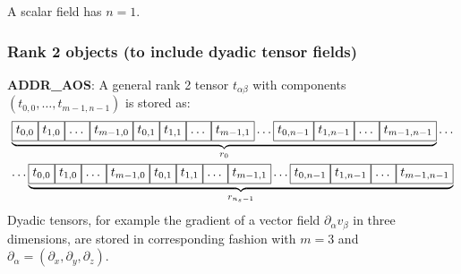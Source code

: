 A scalar field has $n=1$.


\subsubsection{Rank 2 objects (to include dyadic tensor fields)}

\textbf{ADDR\_AOS}:
A general rank 2 tensor $t_{\alpha\beta}$ with components $(t_{0,0},
\ldots, t_{m-1,n-1})$ is stored as:
\begin{gather*}
\underbrace{
\boxed{t_{0,0}\vphantom{t_{m-1,n-1}}} \boxed{t_{1,0}\vphantom{t_{m-1,n-1}}}
\boxed{\ldots\vphantom{t_{m-1,n-1}}} \boxed{t_{m-1,0}\vphantom{t_{m-1,n-1}}}
\boxed{t_{0,1}\vphantom{t_{m-1,n-1}}} \boxed{t_{1,1}\vphantom{t_{m-1,n-1}}}
\boxed{\ldots\vphantom{t_{m-1,n-1}}} \boxed{t_{m-1,1}\vphantom{t_{m-1,n-1}}}
\ldots
\boxed{t_{0,n-1}\vphantom{t_{m-1,n-1}}}\boxed{t_{1,n-1} \vphantom{t_{m-1,n-1}}}
\boxed{\ldots\vphantom{t_{m-1,n-1}}} \boxed{t_{m-1,n-1}\vphantom{t_{m-1,n-1}}}
}_{r_0}
\ldots
\\
\ldots
\underbrace{
\boxed{t_{0,0}\vphantom{t_{m-1,n-1}}} \boxed{t_{1,0}\vphantom{t_{m-1,n-1}}}
\boxed{\ldots\vphantom{t_{m-1,n-1}}} \boxed{t_{m-1,0}\vphantom{t_{m-1,n-1}}}
\boxed{t_{0,1}\vphantom{t_{m-1,n-1}}} \boxed{t_{1,1}\vphantom{t_{m-1,n-1}}}
\boxed{\ldots\vphantom{t_{m-1,n-1}}} \boxed{t_{m-1,1}\vphantom{t_{m-1,n-1}}}
\ldots
\boxed{t_{0,n-1}\vphantom{t_{m-1,n-1}}}\boxed{t_{1,n-1} \vphantom{t_{m-1,n-1}}}
\boxed{\ldots\vphantom{t_{m-1,n-1}}} \boxed{t_{m-1,n-1}\vphantom{t_{m-1,n-1}}}
}_{r_{n_s-1}}
\end{gather*}
Dyadic tensors, for example the gradient of a vector field
$\partial_\alpha v_\beta$ in three dimensions, are stored in corresponding
fashion with $m=3$ and
$\partial_\alpha = (\partial_x, \partial_y, \partial_z)$.

